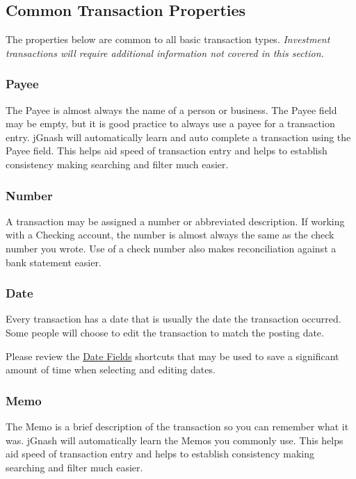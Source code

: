 \documentclass[letterpaper,12pt]{book}
\begin{document}
    \subsection{Common Transaction Properties}
    The properties below are common to all basic transaction types.  \textit{Investment transactions will
    require additional information not covered in this section.}

    \subsubsection*{Payee}
    The Payee is almost always the name of a person or business. The Payee field may be empty, but
    it is good practice to always use a payee for a transaction entry. jGnash will automatically learn
    and auto complete a transaction using the Payee field. This helps aid speed of transaction entry and
    helps to establish consistency making searching and filter much easier.

    \subsubsection*{Number}
    A transaction may be assigned a number or abbreviated description.
    If working with a Checking account, the number is almost always the same as the check number you wrote.
    Use of a check number also makes reconciliation against a bank statement easier.

    \subsubsection*{Date}
    Every transaction has a date that is usually the date the transaction occurred.
    Some people will choose to edit the transaction to match the posting date.

    Please review the \hyperref[subsec:dateFields]{Date Fields} shortcuts that may be used to save a significant
    amount of time when selecting and editing dates.


    \subsubsection*{Memo}
    The Memo is a brief description of the transaction so you can remember what it was.
    jGnash will automatically learn the Memos you commonly use.
    This helps aid speed of transaction entry and helps to establish consistency making searching and filter much easier.
\end{document}
